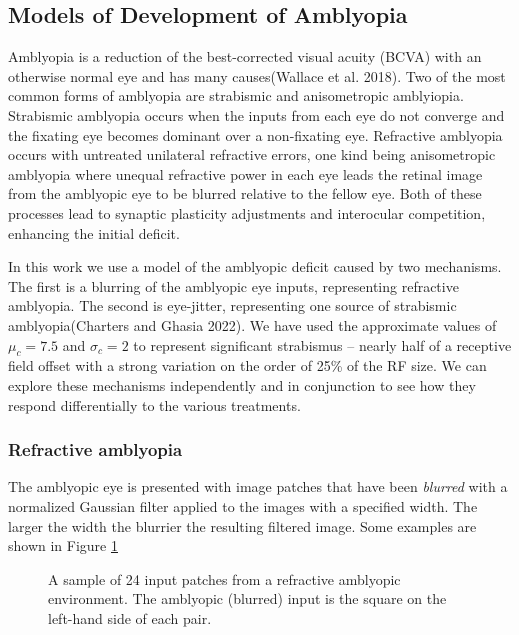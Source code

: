 \documentclass[
  sn-apa,
  pdflatex]{sn-jnl}
\theoremstyle{thmstyleone}%
\theoremstyle{thmstyletwo}%
\theoremstyle{thmstylethree}%
\begin{document}
\hypertarget{models-of-development-of-amblyopia}{%
\subsection{Models of Development of
Amblyopia}\label{models-of-development-of-amblyopia}}

Amblyopia is a reduction of the best-corrected visual acuity (BCVA) with
an otherwise normal eye and has many causes(Wallace et al. 2018). Two of
the most common forms of amblyopia are strabismic and anisometropic
amblyiopia. Strabismic amblyopia occurs when the inputs from each eye do
not converge and the fixating eye becomes dominant over a non-fixating
eye. Refractive amblyopia occurs with untreated unilateral refractive
errors, one kind being anisometropic amblyopia where unequal refractive
power in each eye leads the retinal image from the amblyopic eye to be
blurred relative to the fellow eye. Both of these processes lead to
synaptic plasticity adjustments and interocular competition, enhancing
the initial deficit.

In this work we use a model of the amblyopic deficit caused by two
mechanisms. The first is a blurring of the amblyopic eye inputs,
representing refractive amblyopia. The second is eye-jitter,
representing one source of strabismic amblyopia(Charters and Ghasia
2022). We have used the approximate values of \(\mu_c=7.5\) and
\(\sigma_c=2\) to represent significant strabismus -- nearly half of a
receptive field offset with a strong variation on the order of 25\% of
the RF size. We can explore these mechanisms independently and in
conjunction to see how they respond differentially to the various
treatments.

\hypertarget{refractive-amblyopia}{%
\subsubsection{Refractive amblyopia}\label{refractive-amblyopia}}

The amblyopic eye is presented with image patches that have been
\emph{blurred} with a normalized Gaussian filter applied to the images
with a specified width. The larger the width the blurrier the resulting
filtered image. Some examples are shown in Figure
\ref{fig:blurred-inputs}

\begin{figure}
\hypertarget{fig:blurred-inputs}{%
\centering

\caption{A sample of 24 input patches from a refractive amblyopic
environment. The amblyopic (blurred) input is the square on the
left-hand side of each pair.}\label{fig:blurred-inputs}
}
\end{figure}
\end{document}
